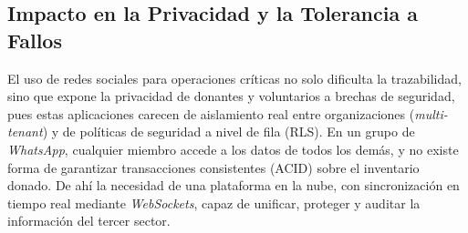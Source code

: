 \subsection{Impacto en la Privacidad y la Tolerancia a Fallos}

El uso de redes sociales para operaciones críticas no solo dificulta la trazabilidad,
sino que expone la privacidad de donantes y voluntarios a brechas de seguridad, pues
estas aplicaciones carecen de aislamiento real entre organizaciones
(\textit{multi-tenant}) y de políticas de seguridad a nivel de fila (RLS). En un
grupo de \textit{WhatsApp}, cualquier miembro accede a los datos de todos los
demás, y no existe forma de garantizar transacciones consistentes (ACID) sobre el
inventario donado. De ahí la necesidad de una plataforma en la nube, con
sincronización en tiempo real mediante \textit{WebSockets}, capaz de unificar,
proteger y auditar la información del tercer sector.
